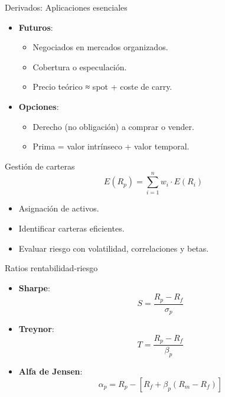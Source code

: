 \documentclass[
  ignorenonframetext,
]{beamer}
\providecommand{\tightlist}{%
  \setlength{\itemsep}{0pt}\setlength{\parskip}{0pt}}\usepackage{longtable,booktabs,array}
\begin{document}
\begin{frame}{Derivados: Aplicaciones esenciales}
\label{derivados-aplicaciones-esenciales}
\begin{itemize}
\tightlist
\item
  \textbf{Futuros}:

  \begin{itemize}
  \tightlist
  \item
    Negociados en mercados organizados.
  \item
    Cobertura o especulación.
  \item
    Precio teórico ≈ spot + coste de carry.
  \end{itemize}
\item
  \textbf{Opciones}:

  \begin{itemize}
  \tightlist
  \item
    Derecho (no obligación) a comprar o vender.
  \item
    Prima = valor intrínseco + valor temporal.
  \end{itemize}
\end{itemize}
\end{frame}

\begin{frame}{Gestión de carteras}
\label{gestiuxf3n-de-carteras}
\[
E(R_p) = \sum_{i=1}^{n} w_i \cdot E(R_i)
\]

\begin{itemize}
\tightlist
\item
  Asignación de activos.
\item
  Identificar carteras eficientes.
\item
  Evaluar riesgo con volatilidad, correlaciones y betas.
\end{itemize}
\end{frame}

\begin{frame}{Ratios rentabilidad-riesgo}
\label{ratios-rentabilidad-riesgo}
\begin{itemize}
\item
  \textbf{Sharpe}: \[
  S = \frac{R_p - R_f}{\sigma_p}
  \]
\item
  \textbf{Treynor}: \[
  T = \frac{R_p - R_f}{\beta_p}
  \]
\item
  \textbf{Alfa de Jensen}: \[
  \alpha_p = R_p - [R_f + \beta_p (R_m - R_f)]
  \]
\end{itemize}
\end{frame}
\end{document}
